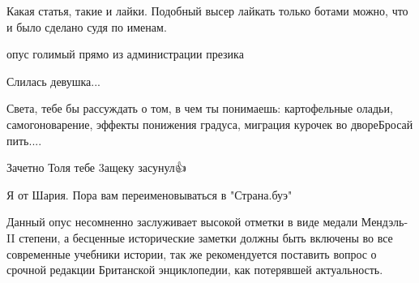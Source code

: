 \begin{itemize}
Какая статья, такие и лайки. Подобный высер лайкать только ботами можно, что и было сделано судя по именам.

 
опус голимый прямо из администрации презика

 
Слилась девушка...

 
Света, тебе бы рассуждать о том, в чем ты понимаешь: картофельные оладьи, самогоноварение, эффекты понижения градуса, миграция курочек во дворе\Laughey[1.0][white] Бросай пить....

 
Зачетно Толя тебе 3ащеку засунул👍


Я от Шария. Пора вам переименовываться в
"Страна.буэ"

 

Данный опус несомненно заслуживает высокой отметки в виде медали Мендэль- II
степени, а бесценные исторические заметки должны быть включены во все
современные учебники истории, так же рекомендуется поставить вопрос о срочной
редакции Британской энциклопедии, как потерявшей актуальность.


 

\end{itemize}
